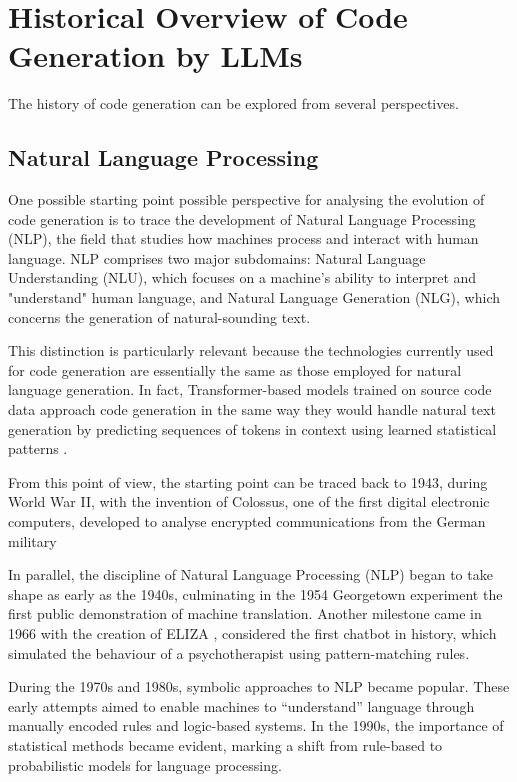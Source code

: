\clearpage
\section{Historical Overview of Code Generation by LLMs}

The history of code generation can be explored from several 
perspectives. 

\subsection{Natural Language Processing} %
One possible starting point possible perspective for 
analysing the evolution of code generation is to trace
the development of Natural Language Processing (NLP), 
the field that studies how machines process and interact 
with human language. NLP comprises two major subdomains: 
Natural Language Understanding (NLU), which focuses on a 
machine's ability to interpret and "understand" human language, 
and Natural Language Generation (NLG), which concerns the 
generation of natural-sounding text.

This distinction is particularly relevant because 
the technologies currently used for code generation 
are essentially the same as those employed for natural 
language generation. In fact, Transformer-based models 
trained on source code data approach code generation in 
the same way they would handle natural text generation 
by predicting sequences of tokens in context using learned 
statistical patterns \cite{vaswani2017attention}.

From this point of view, the starting point can be traced back to 1943, 
during World War II, with the invention of Colossus, one of the first digital 
electronic computers, developed to analyse encrypted communications from the 
German military

In parallel, the discipline of Natural Language Processing 
(NLP) began to take shape as early as the 1940s, culminating 
in the 1954 Georgetown experiment the first public demonstration 
of machine translation. Another milestone came in 1966 with the 
creation of ELIZA \cite{weizenbaum1966eliza}, considered the first 
chatbot in history, which simulated the behaviour of a psychotherapist 
using pattern-matching rules.

During the 1970s and 1980s, symbolic approaches to NLP became popular. 
These early attempts aimed to enable machines to “understand” language 
through manually encoded rules and logic-based systems. In the 1990s, 
the importance of statistical methods became evident, marking a shift 
from rule-based to probabilistic models for language processing.

